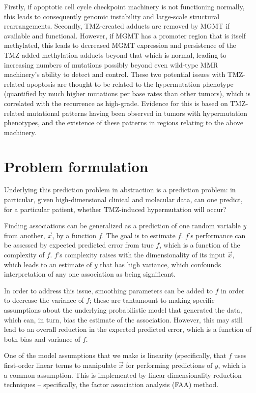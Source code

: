 Firstly, if apoptotic cell cycle checkpoint machinery is not functioning normally, this leads to consequently genomic instability and large-scale structural rearrangements.  Secondly, TMZ-created adducts are removed by MGMT if available and functional. However, if MGMT has a promoter region that is itself methylated, this leads to decreased MGMT expression and persistence of the TMZ-added methylation adducts beyond that which is normal, leading to increasing numbers of mutations possibly beyond even wild-type MMR machinery’s ability to detect and control. 
These two potential issues with TMZ-related apoptosis are thought to be related to the hypermutation phenotype (quantified by much higher mutations per base rates than other tumors), which is correlated with the recurrence as high-grade. Evidence for this is based on TMZ-related mutational patterns having been observed in tumors with hypermutation phenotypes, and the existence of these patterns in regions relating to the above machinery.

\section{Problem formulation}

Underlying this prediction problem in abstraction is a prediction problem: in particular, given high-dimensional clinical and molecular data, can one predict, for a particular patient, whether TMZ-induced hypermutation will occur?


Finding associations can be generalized as a prediction of one random variable $y$ from another, $\vec{x}$, by a function $f$. The goal is to estimate $f$. $f$'s performance can be assessed by expected predicted error from true $f$, which is a function of the complexity of $f$. $f$'s complexity raises with the dimensionality of its input $\vec{x}$, which leads to an estimate of $y$ that has high variance, which confounds interpretation of any one association as being significant.

In order to address this issue, smoothing parameters can be added to $f$ in order to decrease the variance of $f$; these are tantamount to making specific assumptions about the underlying probabilistic model that generated the data, which can, in turn, bias the estimate of the 
association. However, this may still lead to an overall reduction in the expected predicted error, which is a function of both bias and variance of $f$.


One of the model assumptions that we make is linearity (specifically, that $f$ uses first-order linear terms to manipulate $\vec{x}$ for performing predictions of $y$, which is a common assumption. This is implemented by linear dimensionality reduction techniques – specifically, the factor association analysis (FAA) method.

